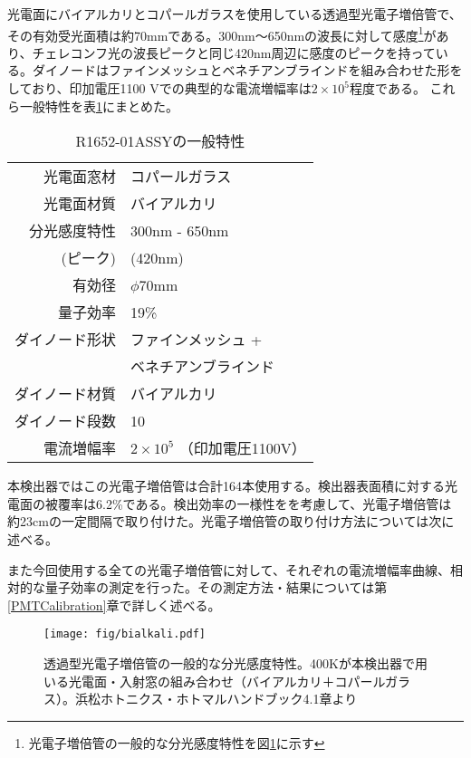 \documentclass[11pt]{jreport}
\newcommand{\figref}[1]{図\ref{#1}}
\newcommand{\tabref}[1]{表\ref{#1}}
\newcommand{\secref}[1]{第\ref{#1}章}
\begin{document}
光電面にバイアルカリとコパールガラスを使用している透過型光電子増倍管で、その有効受光面積は約70mmである。300nm〜650nmの波長に対して感度\footnote{光電子増倍管の一般的な分光感度特性を\figref{Bialkali}に示す}があり、チェレコンフ光の波長ピークと同じ420nm周辺に感度のピークを持っている。ダイノードはファインメッシュとベネチアンブラインドを組み合わせた形をしており、印加電圧1100 Vでの典型的な電流増幅率は$2 \times 10^{5}$程度である。
これら一般特性を\tabref{R1652-spec}にまとめた。

\begin{table}[htbp]
\caption[R1652-01ASSYの一般特性]{R1652-01ASSYの一般特性}
\begin{center}
\begin{tabular}{rl}
\hline \hline
光電面窓材 & コパールガラス \\
光電面材質 & バイアルカリ \\
分光感度特性 & 300nm - 650nm \\
(ピーク) & (420nm) \\
有効径 & $\phi$70mm \\
量子効率 & 19\% \\
ダイノード形状 & ファインメッシュ +\\
 & ベネチアンブラインド \\
ダイノード材質 & バイアルカリ \\
ダイノード段数 & 10 \\
電流増幅率 & $ 2 \times 10^{5}$ （印加電圧1100V）\\
\hline \hline
\end{tabular}
\end{center}
\label{R1652-spec}
\end{table}%

本検出器ではこの光電子増倍管は合計164本使用する。検出器表面積に対する光電面の被覆率は6.2\%である。検出効率の一様性をを考慮して、光電子増倍管は約23cmの一定間隔で取り付けた。光電子増倍管の取り付け方法については次に述べる。

また今回使用する全ての光電子増倍管に対して、それぞれの電流増幅率曲線、相対的な量子効率の測定を行った。その測定方法・結果については\secref{PMTCalibration}で詳しく述べる。

\begin{figure}[!h]
\centering
\texttt{[image: fig/bialkali.pdf]}
\caption[光電子増倍管の一般的な分光感度特性]{透過型光電子増倍管の一般的な分光感度特性。400Kが本検出器で用いる光電面・入射窓の組み合わせ（バイアルカリ＋コパールガラス）。浜松ホトニクス・ホトマルハンドブック4.1章より}
\label{Bialkali}
\end{figure}
\end{document}
